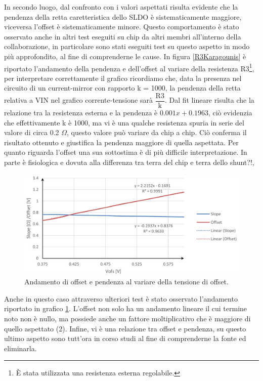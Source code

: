In secondo luogo, dal confronto con i valori aspettati risulta evidente che la pendenza della retta caretteristica dello SLDO è sistematicamente maggiore, viceversa l'offset è sistematicamente minore. 
Questo comportamento è stato osservato anche in altri test eseguiti su chip da altri membri all'interno della collaborazione, in particolare sono stati eseguiti test su questo aspetto in modo più approfondito, al fine di comprenderne le cause. 
In figura \ref{R3Karagounis} è riportato l'andamento della pendenza e dell'offset al variare della resistenza R3\footnote{\`E stata utilizzata una resistenza esterna regolabile.}, per interpretare correttamente il grafico ricordiamo che, data la presenza nel circuito di un current-mirror con rapporto k = 1000, la pendenza della retta relativa a VIN nel grafico corrente-tensione sarà $\mathrm{\dfrac{R3}{k}}$. 
Dal fit lineare risulta che la relazione tra la resistenza esterna e la pendenza è $0.001x + 0.1963$, ciò evidenzia che effettivamente k è 1000, ma vi è una qualche resistenza spuria in serie del valore di circa 0.2 $\Omega$, questo valore può variare da chip a chip. 
Ciò conferma il risultato ottenuto e giustifica la pendenza maggiore di quella aspettata. 
Per quanto riguarda l'offset una sua sottostima è di più difficile interpretazione. In parte è fisiologica e dovuta alla differenza tra terra del chip e terra dello shunt?!, 
\begin{figure}
\centering
\includegraphics[width=\textwidth]{Immagini/OffsetKaragounis}
\caption{Andamento di offset e pendenza al variare della tensione di offset.}%
\label{OffsetKaragounis}
\end{figure}
Anche in questo caso attraverso ulteriori test è stato osservato l'andamento riportato in grafico \ref{OffsetKaragounis}. 
L'offset non solo ha un andamento lineare il cui termine noto non è nullo, ma possiede anche un fattore moltiplicativo che è maggiore di quello aspettato (2). 
Infine, vi è una relazione tra offset e pendenza, su questo ultimo aspetto sono tutt'ora in corso studi al fine di comprenderne la fonte ed eliminarla.








